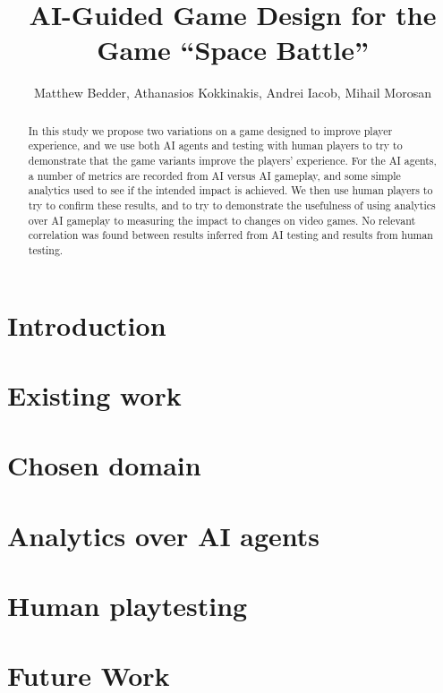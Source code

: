 \documentclass[9pt]{IEEEtran}
\title{AI-Guided Game Design for the Game ``Space Battle''}
\author{Matthew Bedder, Athanasios Kokkinakis, Andrei Iacob, Mihail Morosan}
\begin{document}
\maketitle

\begin{abstract}

In this study we propose two variations on a game designed to improve player experience, and we use both AI agents and testing with human players to try to demonstrate that the game variants improve the players' experience. For the AI agents, a number of metrics are recorded from AI versus AI gameplay, and some simple analytics used to see if the intended impact is achieved. We then use human players to try to confirm these results, and to try to demonstrate the usefulness of using analytics over AI gameplay to measuring the impact to changes on video games. No relevant correlation was found between results inferred from AI testing and results from human testing.

\end{abstract}

\section{Introduction}

\section{Existing work}

\section{Chosen domain}

\section{Analytics over AI agents}

\section{Human playtesting}

\section{Future Work}


\printbibliography[heading=bibnumbered]
\end{document}
